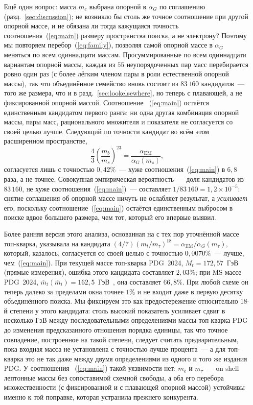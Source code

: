 \documentclass[aps,prd,twocolumn,amsmath,amssymb,floatfix,nofootinbib]{revtex4-2}
\begin{document}
Ещё один вопрос: масса $m_e$ выбрана опорной в $\alpha_G$ по соглашению
(разд.~\ref{sec:discussion}); не возникло бы столь же точное соотношение при
другой опорной массе, и не обязана ли тогда кажущаяся точность
соотношения~(\ref{eq:main}) размеру пространства поиска, а не электрону?
Поэтому мы повторяем перебор~(\ref{eq:family}), позволяя самой опорной массе
в $\alpha_G$ меняться по всем одиннадцати массам. Просуммированные по всем
одиннадцати вариантам опорной массы, каждая из $55$ неупорядоченных пар масс
перебирается ровно один раз (с более лёгким членом пары в роли естественной
опорной массы), так что объединённое семейство вновь состоит из $83\,160$
кандидатов~--- того же размера, что и в разд.~\ref{sec:lookelsewhere}, но
теперь с плавающей, а не фиксированной опорной массой. Соотношение~
(\ref{eq:main}) остаётся единственным кандидатом первого ранга: ни одна
другая комбинация опорной массы, пары масс, рационального множителя и
показателя не согласуется со своей целью лучше. Следующий по точности
кандидат во всём этом расширенном пространстве,
\begin{equation}
\frac{4}{3}\left(\frac{m_b}{m_s}\right)^{\!23}
= \frac{\alpha_{\mathrm{EM}}}{\alpha_G(m_s)},
\end{equation}
согласуется лишь с точностью $0{,}42\%$~--- хуже соотношения~(\ref{eq:main})
в $6{,}8$ раза, а не точнее. Совокупная эмпирическая вероятность~--- доля
кандидатов из $83\,160$, не хуже соотношения~(\ref{eq:main})~--- составляет
$1/83\,160=1{,}2\times 10^{-5}$: снятие соглашения об опорной массе ничуть
не ослабляет результат, а \emph{усиливает} его, поскольку
соотношение~(\ref{eq:main}) остаётся единственным выбросом в поиске вдвое
большего размера, чем тот, который его впервые выявил.

Более ранняя версия этого анализа, основанная на с тех пор уточнённой массе
топ-кварка, указывала на кандидата
$(4/7)(m_t/m_\tau)^{18}=\alpha_{\mathrm{EM}}/\alpha_G(m_\tau)$, который,
казалось, согласуется со своей целью с точностью $0{,}0070\%$~--- лучше,
чем~(\ref{eq:main}). При текущей массе топ-кварка PDG~2024,
$M_t=172{,}57$~ГэВ (прямые измерения), ошибка этого кандидата составляет
$2{,}03\%$; при $\overline{\mathrm{MS}}$-массе PDG~2024,
$\overline{m}_t(\overline{m}_t)=162{,}5$~ГэВ~\cite{pdg2024}, она составляет
$66{,}8\%$. При любой схеме он теперь далеко за пределами окна точнее $1\%$
и не входит даже в первую десятку объединённого поиска. Мы фиксируем это
как предостережение относительно 18-й степени у этого кандидата: столь
высокий показатель усиливает сдвиг в несколько ГэВ между последовательными
определениями массы топ-кварка PDG до изменения предсказанного отношения
порядка единицы, так что точное совпадение, построенное на такой степени,
следует считать предварительным, пока входная масса не установлена с
точностью лучше процента~--- а для топ-кварка это не так даже между двумя
определениями из одного и того же издания PDG. У соотношения~
(\ref{eq:main}) такой уязвимости нет: $m_e$ и $m_\tau$~--- on-shell
лептонные массы без сопоставимой схемной свободы, а оба его перебора
множественности (с фиксированной и с плавающей опорной массой) устойчивы
именно к той поправке, которая устранила прежнего конкурента.
\end{document}
